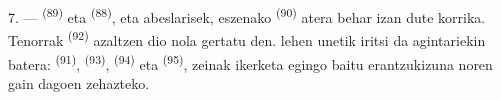 7. ---  \textsuperscript{(89)} eta 
\textsuperscript{(88)},  eta abeslarisek, eszenako
 \textsuperscript{(90)} atera behar izan dute korrika. Tenorrak
 \textsuperscript{(92)} azaltzen dio nola gertatu den.
 lehen unetik iritsi da agintariekin batera:
 \textsuperscript{(91)}, 
\textsuperscript{(93)},  \textsuperscript{(94)} eta
 \textsuperscript{(95)}, zeinak ikerketa egingo baitu
erantzukizuna noren gain dagoen zehazteko.
\VUsaut{6.0mm}
\VUfilet{22mm}
